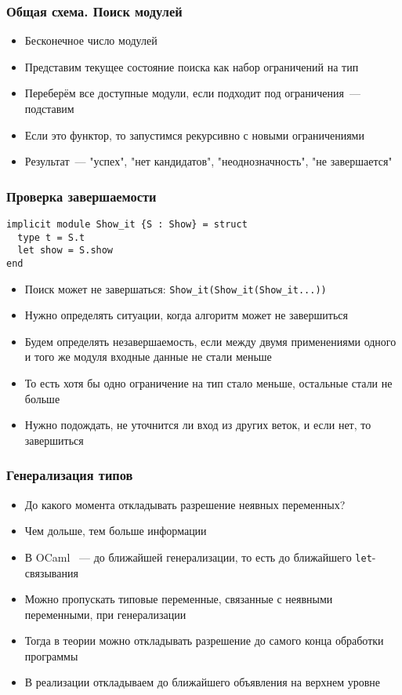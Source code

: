 \documentclass{beamer}
\begin{document}
\begin{frame}\frametitle{Общая схема. Поиск модулей}
\begin{itemize}
  \item Бесконечное число модулей
  \item Представим текущее состояние поиска как набор ограничений на тип
  \item Переберём все доступные модули, если подходит под ограничения~--- подставим
  \item Если это функтор, то запустимся рекурсивно с новыми ограничениями
  \item Результат~--- "успех", "нет кандидатов", "неоднозначность", "не завершается"
\end{itemize}
\end{frame}

\lstset{language=caml}
\begin{frame}[fragile]\frametitle{Проверка завершаемости}
\begin{lstlisting}
implicit module Show_it {S : Show} = struct
  type t = S.t
  let show = S.show
end
\end{lstlisting}
\begin{itemize}
  \item Поиск может не завершаться: \texttt{Show\_it(Show\_it(Show\_it...))}
  \item Нужно определять ситуации, когда алгоритм может не завершиться
  \item Будем определять незавершаемость, если между двумя применениями одного и того же модуля входные данные не стали меньше
  \item То есть хотя бы одно ограничение на тип стало меньше, остальные стали не больше
  \item Нужно подождать, не уточнится ли вход из других веток, и если нет, то завершиться
\end{itemize}
\end{frame}

\begin{frame}\frametitle{Генерализация типов}
\begin{itemize}
  \item До какого момента откладывать разрешение неявных переменных?
  \item Чем дольше, тем больше информации
  \item В OCaml ~--- до ближайшей генерализации, то есть до ближайшего \texttt{let}-связывания
  \item Можно пропускать типовые переменные, связанные с неявными переменными, при генерализации
  \item Тогда в теории можно откладывать разрешение до самого конца обработки программы
  \item В реализации откладываем до ближайшего объявления на верхнем уровне
\end{itemize}
\end{frame}
\end{document}
